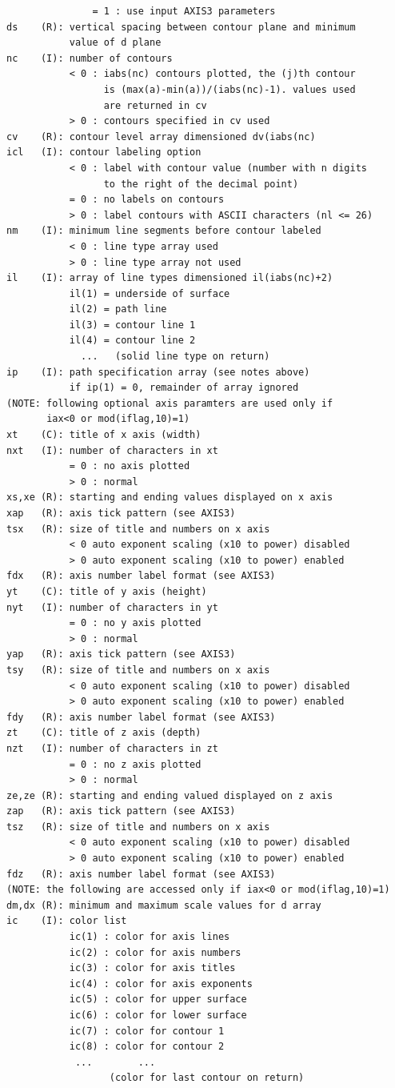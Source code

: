 \documentclass[11pt]{report}
\begin{document}
\begin{verbatim}
               = 1 : use input AXIS3 parameters
ds    (R): vertical spacing between contour plane and minimum
           value of d plane
nc    (I): number of contours
           < 0 : iabs(nc) contours plotted, the (j)th contour
                 is (max(a)-min(a))/(iabs(nc)-1). values used
                 are returned in cv
           > 0 : contours specified in cv used
cv    (R): contour level array dimensioned dv(iabs(nc)
icl   (I): contour labeling option
           < 0 : label with contour value (number with n digits
                 to the right of the decimal point)
           = 0 : no labels on contours
           > 0 : label contours with ASCII characters (nl <= 26)
nm    (I): minimum line segments before contour labeled
           < 0 : line type array used
           > 0 : line type array not used
il    (I): array of line types dimensioned il(iabs(nc)+2)
           il(1) = underside of surface
           il(2) = path line
           il(3) = contour line 1
           il(4) = contour line 2
             ...   (solid line type on return)
ip    (I): path specification array (see notes above)
           if ip(1) = 0, remainder of array ignored
(NOTE: following optional axis paramters are used only if
       iax<0 or mod(iflag,10)=1)
xt    (C): title of x axis (width)
nxt   (I): number of characters in xt
           = 0 : no axis plotted
           > 0 : normal
xs,xe (R): starting and ending values displayed on x axis
xap   (R): axis tick pattern (see AXIS3)
tsx   (R): size of title and numbers on x axis
           < 0 auto exponent scaling (x10 to power) disabled
           > 0 auto exponent scaling (x10 to power) enabled
fdx   (R): axis number label format (see AXIS3)
yt    (C): title of y axis (height)
nyt   (I): number of characters in yt
           = 0 : no y axis plotted
           > 0 : normal
yap   (R): axis tick pattern (see AXIS3)
tsy   (R): size of title and numbers on x axis
           < 0 auto exponent scaling (x10 to power) disabled
           > 0 auto exponent scaling (x10 to power) enabled
fdy   (R): axis number label format (see AXIS3)
zt    (C): title of z axis (depth)
nzt   (I): number of characters in zt
           = 0 : no z axis plotted
           > 0 : normal
ze,ze (R): starting and ending valued displayed on z axis
zap   (R): axis tick pattern (see AXIS3)
tsz   (R): size of title and numbers on x axis
           < 0 auto exponent scaling (x10 to power) disabled
           > 0 auto exponent scaling (x10 to power) enabled
fdz   (R): axis number label format (see AXIS3)
(NOTE: the following are accessed only if iax<0 or mod(iflag,10)=1)
dm,dx (R): minimum and maximum scale values for d array
ic    (I): color list
           ic(1) : color for axis lines
           ic(2) : color for axis numbers
           ic(3) : color for axis titles
           ic(4) : color for axis exponents
           ic(5) : color for upper surface
           ic(6) : color for lower surface
           ic(7) : color for contour 1
           ic(8) : color for contour 2
            ...        ...
                  (color for last contour on return)
\end{verbatim}
\end{document}
